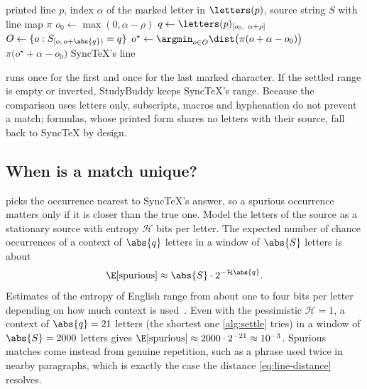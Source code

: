 \begin{algorithm}[t]
\caption{Settling one end of a selection}
\label{alg:settle}
\begin{algorithmic}[1]
\Require printed line $p$, index $\alpha$ of the marked letter in $\letters(p)$, source string $S$ with line map $\pi$
 
  \State $o_0 \gets \max(0, \alpha - \rho)$
  \State $q \gets \letters(p)_{[o_0,\ \alpha + \rho]}$
  \State $O \gets \{ o : S_{[o,\, o + \abs{q})} = q \}$
    \State $o^{\star} \gets \argmin_{o \in O} \dist\bigl(\pi(o + \alpha - o_0)\bigr)$
    \State \Return $\pi\bigl(o^{\star} + \alpha - o_0\bigr)$
  \EndIf
\EndFor
\State \Return SyncTeX's line 
\end{algorithmic}
\end{algorithm}

 runs once for the first and once for the last marked
character. If the settled range is empty or inverted, StudyBuddy keeps SyncTeX's
range. Because the comparison uses letters only, subscripts, macros and
hyphenation do not prevent a match; formulas, whose printed form shares no
letters with their source, fall back to SyncTeX by design.

\subsection{When is a match unique?}

 picks the occurrence nearest to SyncTeX's answer, so a
spurious occurrence matters only if it is closer than the true one. Model the
letters of the source as a stationary source with entropy $\mathcal{H}$ bits per letter.
The expected number of chance occurrences of a context of $\abs{q}$ letters in
a window of $\abs{S}$ letters is about
\begin{equation}
  \E[\text{spurious}] \approx \abs{S} \cdot 2^{-\mathcal{H} \abs{q}} .
  \label{eq:spurious}
\end{equation}
Estimates of the entropy of English range from about one to four bits per
letter depending on how much context is used~\cite{shannon1951}. Even with the
pessimistic $\mathcal{H} = 1$, a context of $\abs{q} = 21$ letters (the shortest one
\cref{alg:settle} tries) in a window of $\abs{S} = 2000$ letters gives
$\E[\text{spurious}] \approx 2000 \cdot 2^{-21} \approx 10^{-3}$. Spurious
matches come instead from genuine repetition, such as a phrase used twice in
nearby paragraphs, which is exactly the case the distance
\cref{eq:line-distance} resolves.

